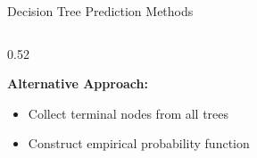 \documentclass{beamer}
\begin{document}
\begin{frame}{Decision Tree Prediction Methods}
\begin{columns}[T]
\begin{column}{0.52\textwidth}
\vspace{0.4cm}

\textbf{Alternative Approach:}
\begin{itemize}
    \item Collect terminal nodes from all trees
    \item Construct empirical probability function
\end{itemize}

\end{column}

\end{columns}

\end{frame}
\end{document}
